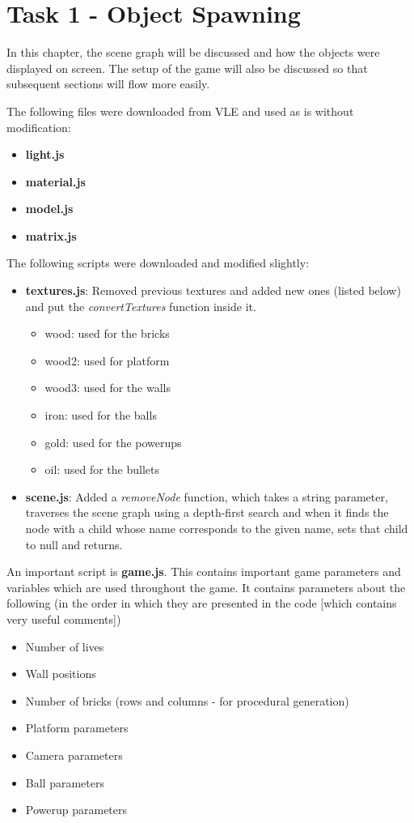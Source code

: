 \chapter{Task 1 - Object Spawning}
In this chapter, the scene graph will be discussed and how the objects were displayed on screen. The setup of the game will also be discussed so that subsequent sections will flow more easily.

The following files were downloaded from VLE and used as is without modification:
\begin{itemize}
	\item \textbf{light.js}
	\item \textbf{material.js}
	\item \textbf{model.js}
	\item \textbf{matrix.js}
\end{itemize}

The following scripts were downloaded and modified slightly:

\begin{itemize}
	\item \textbf{textures.js}: Removed previous textures and added new ones (listed below) and put the \textit{convertTextures} function inside it.
	\begin{itemize}
		\item wood: used for the bricks
		\item wood2: used for platform
		\item wood3: used for the walls
		\item iron: used for the balls
		\item gold: used for the powerups
		\item oil: used for the bullets
	\end{itemize}

	\item \textbf{scene.js}: Added a \textit{removeNode} function, which takes a string parameter, traverses the scene graph using a depth-first search and when it finds the node with a child whose name corresponds to the given name, sets that child to null and returns.
\end{itemize}

An important script is \textbf{game.js}. This contains important game parameters and variables which are used throughout the game. It contains parameters about the following (in the order in which they are presented in the code [which contains very useful comments])
\begin{itemize}
	\item Number of lives
	\item Wall positions
	\item Number of bricks (rows and columns - for procedural generation)
	\item Platform parameters
	\item Camera parameters
	\item Ball parameters
	\item Powerup parameters
\end{itemize}

